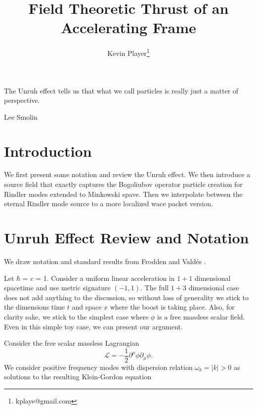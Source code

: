 \documentclass[12pt,a4paper]{article}
\begin{document}
\title{Field Theoretic Thrust of an Accelerating Frame}
\author[1]{Kevin Player\footnote{kplaye@gmail.com}}

\maketitle

\epigraph{The Unruh effect tells us that what we call particles is really just a matter of perspective.}{Lee Smolin}


\section{Introduction}
We first present some notation and review the Unruh effect.  We then introduce a source field that exactly captures the Bogoliubov operator particle creation for Rindler modes extended to Minkowski spave.  Then we interpolate between the eternal Rindler mode source to a more localized wace packet version.

\section{Unruh Effect Review and Notation}

We draw notation and standard results from Frodden and Vald{\'{e}}s \cite{Frodden}.

Let $\hbar$ = $c$ = 1. Consider a uniform linear acceleration in $1+1$ dimensional spacetime and use metric signature $(-1,1)$. The full $1+3$ dimensional case does not add anything to the discussion, so without loss of generality we stick to the dimensions time $t$ and space $x$ where the boost is taking place.  Also, for clarity sake, we stick to the simplest case where $\phi$ is a free massless scalar field.  Even in this simple toy case, we can present our argument.

Consider the free scalar massless Lagrangian
\begin{equation}
\mathscr{L} = -\frac{1}{2} \partial^\mu \phi \partial_\mu \phi.
\end{equation}
We consider positive frequency modes with dispersion relation $\omega_k = |k| > 0$ as solutions to the resulting Klein-Gordon equation 
\end{document}

